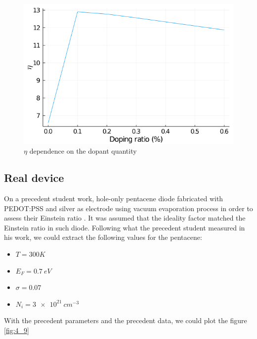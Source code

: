 \begin{figure}[!h]
    \centering
    \includegraphics*[width=.5\paperwidth]{figures/4_thermal/ein_doped.png}
    \caption{$\eta$ dependence on the dopant quantity\label{fig:4_8}}
\end{figure}

\subsection{Real device}

On a precedent student work, hole-only pentacene diode fabricated with PEDOT:PSS and silver as electrode using vacuum evaporation process in order to assess their Einstein ratio \cite{xavier_thesis}. It was assumed that the ideality factor matched the Einstein ratio in such diode. Following what the precedent student measured in his work, we could extract the following values for the pentacene:

\begin{itemize}
    \item $T = 300K$
    \item $E_F = \SI{0.7}{eV}$
    \item $\sigma = 0.07$
    \item $N_i = \SI{3e21}{cm^{-3}}$
\end{itemize}

With the precedent parameters and the precedent data, we could plot the figure \ref{fig:4_9}

